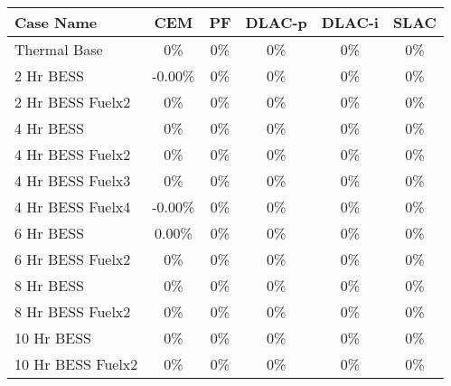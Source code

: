 \begin{tabular}{lccccc}
\toprule
Case Name & CEM & PF & DLAC-p & DLAC-i & SLAC \\
\midrule
Thermal Base & 0\% & 0\% & 0\% & 0\% & 0\% \\
2 Hr BESS & -0.00\% & 0\% & 0\% & 0\% & 0\% \\
2 Hr BESS Fuelx2 & 0\% & 0\% & 0\% & 0\% & 0\% \\
4 Hr BESS & 0\% & 0\% & 0\% & 0\% & 0\% \\
4 Hr BESS Fuelx2 & 0\% & 0\% & 0\% & 0\% & 0\% \\
4 Hr BESS Fuelx3 & 0\% & 0\% & 0\% & 0\% & 0\% \\
4 Hr BESS Fuelx4 & -0.00\% & 0\% & 0\% & 0\% & 0\% \\
6 Hr BESS & 0.00\% & 0\% & 0\% & 0\% & 0\% \\
6 Hr BESS Fuelx2 & 0\% & 0\% & 0\% & 0\% & 0\% \\
8 Hr BESS & 0\% & 0\% & 0\% & 0\% & 0\% \\
8 Hr BESS Fuelx2 & 0\% & 0\% & 0\% & 0\% & 0\% \\
10 Hr BESS & 0\% & 0\% & 0\% & 0\% & 0\% \\
10 Hr BESS Fuelx2 & 0\% & 0\% & 0\% & 0\% & 0\% \\
\bottomrule
\end{tabular}
